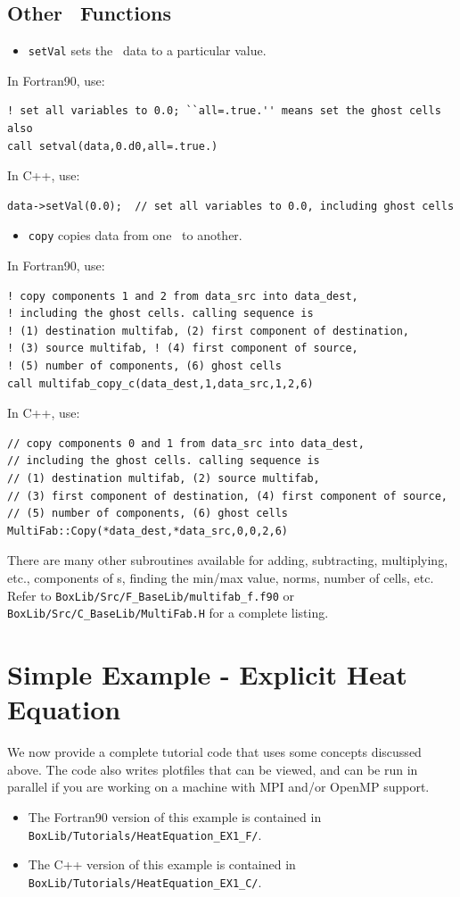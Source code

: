 \subsection{Other \MultiFab\ Functions}
\begin{itemize}
\item {\tt setVal} sets the \MultiFab\ data to a particular value.
\end{itemize}
In Fortran90, use:
\begin{lstlisting}[backgroundcolor=\color{light-green}]
! set all variables to 0.0; ``all=.true.'' means set the ghost cells also
call setval(data,0.d0,all=.true.)
\end{lstlisting}
In C++, use:
\begin{lstlisting}[backgroundcolor=\color{light-blue}]
data->setVal(0.0);  // set all variables to 0.0, including ghost cells
\end{lstlisting}
\begin{itemize}
\item {\tt copy} copies data from one \MultiFab\ to another.
\end{itemize}
In Fortran90, use:
\begin{lstlisting}[backgroundcolor=\color{light-green}]
! copy components 1 and 2 from data_src into data_dest, 
! including the ghost cells. calling sequence is 
! (1) destination multifab, (2) first component of destination, 
! (3) source multifab, ! (4) first component of source, 
! (5) number of components, (6) ghost cells
call multifab_copy_c(data_dest,1,data_src,1,2,6)
\end{lstlisting}
In C++, use:
\begin{lstlisting}[backgroundcolor=\color{light-blue}]
// copy components 0 and 1 from data_src into data_dest, 
// including the ghost cells. calling sequence is 
// (1) destination multifab, (2) source multifab, 
// (3) first component of destination, (4) first component of source, 
// (5) number of components, (6) ghost cells
MultiFab::Copy(*data_dest,*data_src,0,0,2,6)
\end{lstlisting}
There are many other subroutines available for adding, subtracting, multiplying, etc.,
components of \MultiFab s, finding the min/max value, norms, number of cells, etc.
Refer to {\tt BoxLib/Src/F\_BaseLib/multifab\_f.f90} or 
{\tt BoxLib/Src/C\_BaseLib/MultiFab.H} for a complete listing.

\section{Simple Example - Explicit Heat Equation}
We now provide a complete tutorial code that uses some concepts discussed above.
The code also writes plotfiles that can be viewed, and can be run in parallel if you
are working on a machine with MPI and/or OpenMP support.
\begin{itemize}
\item The Fortran90 version of this example is contained in {\tt BoxLib/Tutorials/HeatEquation\_EX1\_F/}.
\item The C++ version of this example is contained in {\tt BoxLib/Tutorials/HeatEquation\_EX1\_C/}.
\end{itemize}

